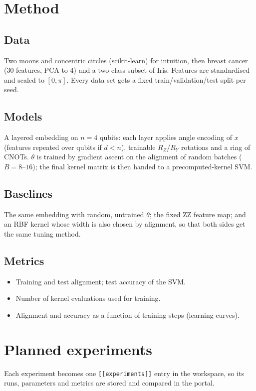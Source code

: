 \documentclass[11pt,a4paper]{article}
\begin{document}
\section{Method}
\subsection{Data}
Two moons and concentric circles (scikit-learn) for intuition, then breast cancer (30 features,
PCA to 4) and a two-class subset of Iris. Features are standardised and scaled to $[0,\pi]$.
Every data set gets a fixed train/validation/test split per seed.

\subsection{Models}
A layered embedding on $n=4$ qubits: each layer applies angle encoding of $x$ (features repeated
over qubits if $d<n$), trainable $R_Z$/$R_Y$ rotations and a ring of CNOTs. $\theta$ is trained by
gradient ascent on the alignment of random batches ($B=8$--$16$); the final kernel matrix is then
handed to a precomputed-kernel SVM.

\subsection{Baselines}
The same embedding with random, untrained $\theta$; the fixed ZZ feature map; and an RBF kernel whose
width is also chosen by alignment, so that both sides get the same tuning method.

\subsection{Metrics}
\begin{itemize}
  \item Training and test alignment; test accuracy of the SVM.
  \item Number of kernel evaluations used for training.
  \item Alignment and accuracy as a function of training steps (learning curves).
\end{itemize}

\section{Planned experiments}
Each experiment becomes one \texttt{[[experiments]]} entry in the workspace, so its runs, parameters
and metrics are stored and compared in the portal.
\end{document}
